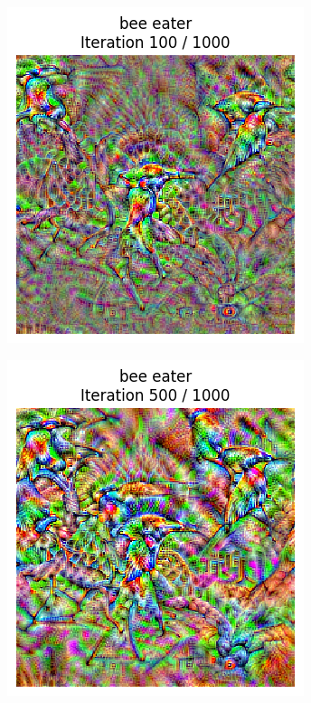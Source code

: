 \begin{figure}[H]
    \centering
    \begin{subfigure}[t]{.25\textwidth}
        \centering
        \includegraphics[width=\linewidth]{VGG/VGG_bird_animated_1000_regpp_blur_100_frame.png}
        \caption{}
        \label{fig:class_viz_iter_vgg:sub1}
    \end{subfigure}%
    \begin{subfigure}[t]{.25\textwidth}
        \centering
        \includegraphics[width=\linewidth]{VGG/VGG_bird_animated_1000_regpp_blur_500_frame.png}

\end{subfigure}
\end{figure}
